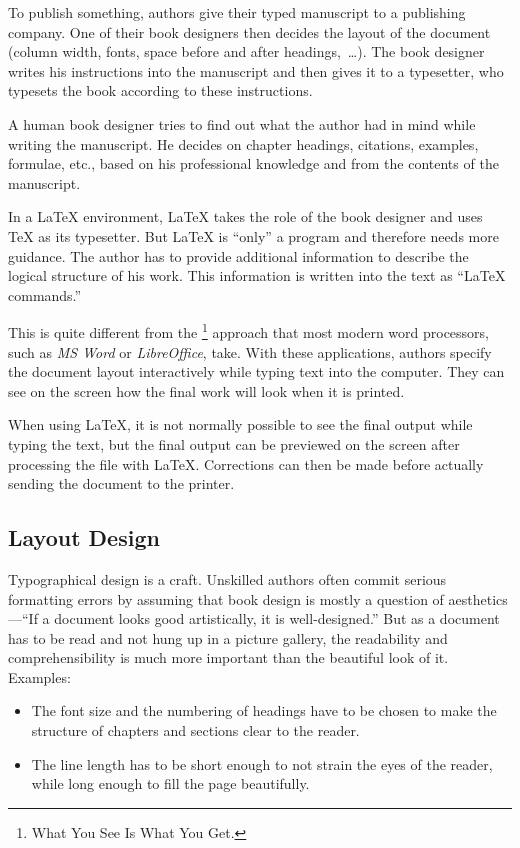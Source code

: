 To publish something, authors give their typed manuscript to a
publishing company. One of their book designers then
decides the layout of the document (column width, fonts, space before
and after headings,~\ldots). The book designer writes his instructions
into the manuscript and then gives it to a typesetter, who typesets the
book according to these instructions.

A human book designer tries to find out what the author had in mind
while writing the manuscript. He decides on chapter headings,
citations, examples, formulae, etc., based on his professional
knowledge and from the contents of the manuscript.

In a \LaTeX{} environment, \LaTeX{} takes the role of the book designer and
uses \TeX{} as its typesetter. But \LaTeX{} is \enquote{only} a program and
therefore needs more guidance. The author has to provide additional information
to describe the logical structure of his work. This information is written into
the text as \enquote{\LaTeX{} commands.}

This is quite different from the \footnote{What You See Is
  What You Get.} approach that most modern word processors, such as
\emph{MS Word} or \emph{LibreOffice}, take. With these
applications, authors specify the document layout interactively while
typing text into the computer. They can see on the
screen how the final work will look when it is printed.

When using \LaTeX{}, it is not normally possible to see the final output
while typing the text, but the final output can be previewed on the
screen after processing the file with \LaTeX. Corrections can then be
made before actually sending the document to the printer.

\subsection{Layout Design}\label{sec:layout_design}

Typographical design is a craft. Unskilled authors often commit
serious formatting errors by assuming that book design is mostly a
question of aesthetics---\enquote{If a document looks good artistically,
  it is well-designed.} But as a document has to be read and not hung
up in a picture gallery, the readability and comprehensibility is
much more important than the beautiful look of it.
Examples:
\begin{itemize}
  \item The font size and the numbering of headings have to be chosen to make
        the structure of chapters and sections clear to the reader.
  \item The line length has to be short enough to not strain
        the eyes of the reader, while long enough to fill the page
        beautifully.
\end{itemize}

